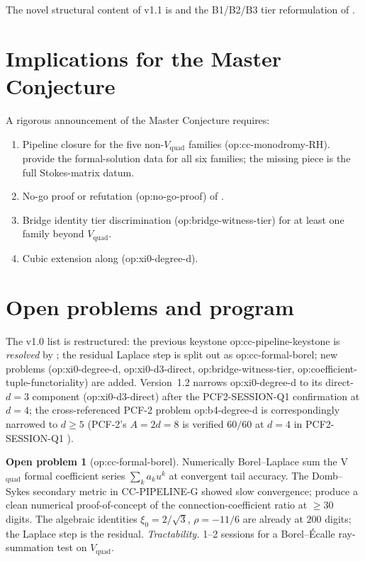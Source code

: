 \documentclass[11pt,reqno]{amsart}
\theoremstyle{plain}
\theoremstyle{definition}
\newtheorem{problem}[theorem]{Open problem}
\theoremstyle{remark}
\newcommand{\Vquad}{V_{\mathrm{quad}}}
\begin{document}
The novel structural content of v1.1 is
 and the
B1/B2/B3 tier reformulation of .

\section{Implications for the Master Conjecture}
\label{sec:implications}

A rigorous announcement of the Master Conjecture requires:
\begin{enumerate}
\item Pipeline closure for the five non-$\Vquad$ families
(\textsf{op:cc-monodromy-RH}). 
provide the formal-solution data for all six families;
the missing piece is the full Stokes-matrix datum.
\item No-go proof or refutation (\textsf{op:no-go-proof})
of .
\item Bridge identity tier discrimination
(\textsf{op:bridge-witness-tier}) for at least one family
beyond $\Vquad$.
\item Cubic extension along
\cite{siarc_pcf2_v11, siarc_pcf2_program}
(\textsf{op:xi0-degree-d}).
\end{enumerate}

\section{Open problems and program}
\label{sec:open}

The v1.0 list is restructured: the previous keystone
\textsf{op:cc-pipeline-keystone} is \emph{resolved} by
; the residual Laplace step is split out
as \textsf{op:cc-formal-borel}; new problems
(\textsf{op:xi0-degree-d}, \textsf{op:xi0-d3-direct},
\textsf{op:bridge-witness-tier},
\textsf{op:coefficient-tuple-functoriality}) are added.
Version~1.2 narrows \textsf{op:xi0-degree-d} to its
direct-$d=3$ component (\textsf{op:xi0-d3-direct}) after the
PCF2-SESSION-Q1 confirmation at $d=4$; the cross-referenced
PCF-2 problem \textsf{op:b4-degree-d} \cite{siarc_pcf2_v11}
is correspondingly narrowed to $d \ge 5$ (PCF-2's
$A = 2d = 8$ is verified $60/60$ at $d=4$ in
PCF2-SESSION-Q1 \cite{siarc_pcf2_session_q1}).

\begin{problem}[\textsf{op:cc-formal-borel}]
Numerically Borel--Laplace sum the V$_\mathrm{quad}$
formal coefficient series $\sum_k a_k u^k$ at convergent
tail accuracy. The Domb--Sykes secondary metric in
CC-PIPELINE-G \cite{siarc_cc_pipeline_g} showed slow
convergence; produce a clean numerical proof-of-concept of
the connection-coefficient ratio at $\ge 30$ digits. The
algebraic identities $\xi_0 = 2/\sqrt 3$, $\rho = -11/6$
are already at $200$ digits; the Laplace step is the residual.
\emph{Tractability.} 1--2 sessions for a Borel--\'Ecalle
ray-summation test on $\Vquad$.
\end{problem}
\end{document}
